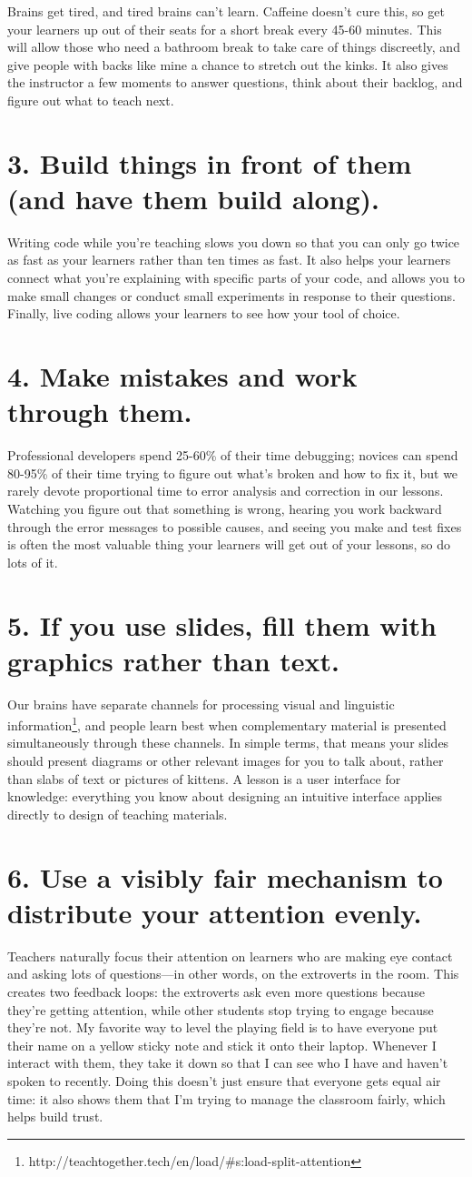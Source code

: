 \documentclass[10pt,letterpaper]{article}
\newcommand{\rulemajor}[1]{\section{#1}}
\begin{document}
Brains get tired, and tired brains can't learn.
Caffeine doesn't cure this,
so get your learners up out of their seats for a short break every 45-60 minutes.
This will allow those who need a bathroom break to take care of things discreetly,
and give people with backs like mine a chance to stretch out the kinks.
It also gives the instructor a few moments to answer questions,
think about their backlog,
and figure out what to teach next.

\rulemajor{3. Build things in front of them (and have them build along).}

Writing code while you're teaching slows you down so that you can only go twice as fast as your learners
rather than ten times as fast.
It also helps your learners connect what you're explaining with specific parts of your code,
and allows you to make small changes or conduct small experiments in response to their questions.
Finally,
live coding allows your learners to see how your tool of choice.

\rulemajor{4. Make mistakes and work through them.}

Professional developers spend 25-60\% of their time debugging;
novices can spend 80-95\% of their time trying to figure out what's broken and how to fix it,
but we rarely devote proportional time to error analysis and correction in our lessons.
Watching you figure out that something is wrong,
hearing you work backward through the error messages to possible causes,
and seeing you make and test fixes is often the most valuable thing your learners will get out of your lessons,
so do lots of it.

\rulemajor{5. If you use slides, fill them with graphics rather than text.}

Our brains have separate channels for
processing visual and linguistic information\footnote{http://teachtogether.tech/en/load/\#s:load-split-attention},
and people learn best when complementary material is presented simultaneously through these channels.
In simple terms,
that means your slides should present diagrams or other relevant images for you to talk about,
rather than slabs of text or pictures of kittens.
A lesson is a user interface for knowledge:
everything you know about designing an intuitive interface applies directly to design of teaching materials.

\rulemajor{6. Use a visibly fair mechanism to distribute your attention evenly.}

Teachers naturally focus their attention on learners who are making eye contact and asking lots of questions---in other words,
on the extroverts in the room.
This creates two feedback loops:
the extroverts ask even more questions because they're getting attention,
while other students stop trying to engage because they're not.
My favorite way to level the playing field is to have everyone put their name on a yellow sticky note
and stick it onto their laptop.
Whenever I interact with them, they take it down
so that I can see who I have and haven't spoken to recently.
Doing this doesn't just ensure that everyone gets equal air time:
it also shows them that I'm trying to manage the classroom fairly,
which helps build trust.
\end{document}
